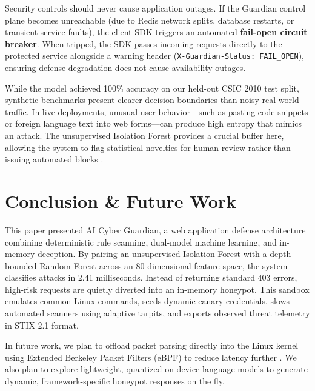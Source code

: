 \documentclass[conference]{IEEEtran}
\begin{document}
Security controls should never cause application outages. If the Guardian control plane becomes unreachable (due to Redis network splits, database restarts, or transient service faults), the client SDK triggers an automated \textbf{fail-open circuit breaker}. When tripped, the SDK passes incoming requests directly to the protected service alongside a warning header (\texttt{X-Guardian-Status: FAIL\_OPEN}), ensuring defense degradation does not cause availability outages.

While the model achieved 100\% accuracy on our held-out CSIC 2010 test split, synthetic benchmarks present clearer decision boundaries than noisy real-world traffic. In live deployments, unusual user behavior---such as pasting code snippets or foreign language text into web forms---can produce high entropy that mimics an attack. The unsupervised Isolation Forest provides a crucial buffer here, allowing the system to flag statistical novelties for human review rather than issuing automated blocks \cite{viegas2021}.

\section{Conclusion \& Future Work}
This paper presented AI Cyber Guardian, a web application defense architecture combining deterministic rule scanning, dual-model machine learning, and in-memory deception. By pairing an unsupervised Isolation Forest with a depth-bounded Random Forest across an 80-dimensional feature space, the system classifies attacks in 2.41 milliseconds. Instead of returning standard 403 errors, high-risk requests are quietly diverted into an in-memory honeypot. This sandbox emulates common Linux commands, seeds dynamic canary credentials, slows automated scanners using adaptive tarpits, and exports observed threat telemetry in STIX 2.1 format.

In future work, we plan to offload packet parsing directly into the Linux kernel using Extended Berkeley Packet Filters (eBPF) to reduce latency further \cite{dokas2002}. We also plan to explore lightweight, quantized on-device language models to generate dynamic, framework-specific honeypot responses on the fly.
\end{document}

